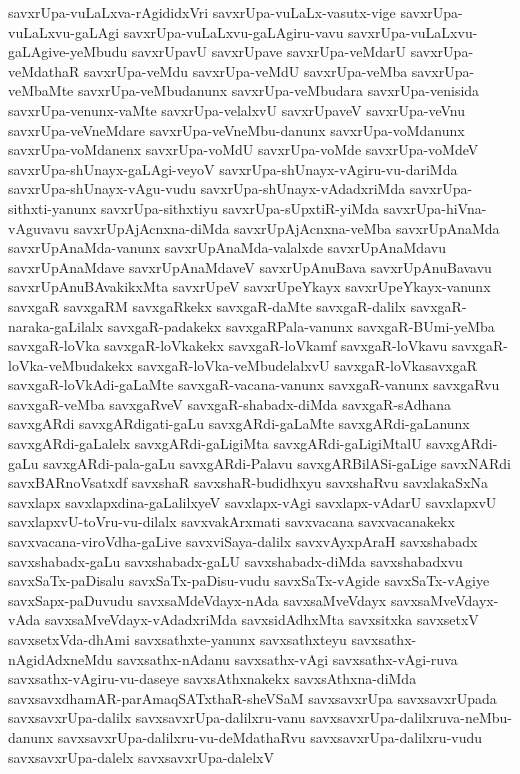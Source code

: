 {savxrUpa-vuLaLxva-rAgididxVri
savxrUpa-vuLaLx-vasutx-vige
savxrUpa-vuLaLxvu-gaLAgi
savxrUpa-vuLaLxvu-gaLAgiru-vavu
savxrUpa-vuLaLxvu-gaLAgive-yeMbudu
savxrUpavU
savxrUpave
savxrUpa-veMdarU
savxrUpa-veMdathaR
savxrUpa-veMdu
savxrUpa-veMdU
savxrUpa-veMba
savxrUpa-veMbaMte
savxrUpa-veMbudanunx
savxrUpa-veMbudara
savxrUpa-venisida
savxrUpa-venunx-vaMte
savxrUpa-velalxvU
savxrUpaveV
savxrUpa-veVnu
savxrUpa-veVneMdare
savxrUpa-veVneMbu-danunx
savxrUpa-voMdanunx
savxrUpa-voMdanenx
savxrUpa-voMdU
savxrUpa-voMde
savxrUpa-voMdeV
savxrUpa-shUnayx-gaLAgi-veyoV
savxrUpa-shUnayx-vAgiru-vu-dariMda
savxrUpa-shUnayx-vAgu-vudu
savxrUpa-shUnayx-vAdadxriMda
savxrUpa-sithxti-yanunx
savxrUpa-sithxtiyu
savxrUpa-sUpxtiR-yiMda
savxrUpa-hiVna-vAguvavu
savxrUpAjAcnxna-diMda
savxrUpAjAcnxna-veMba
savxrUpAnaMda
savxrUpAnaMda-vanunx
savxrUpAnaMda-valalxde
savxrUpAnaMdavu
savxrUpAnaMdave
savxrUpAnaMdaveV
savxrUpAnuBava
savxrUpAnuBavavu
savxrUpAnuBAvakikxMta
savxrUpeV
savxrUpeYkayx
savxrUpeYkayx-vanunx
savxgaR
savxgaRM
savxgaRkekx
savxgaR-daMte
savxgaR-dalilx
savxgaR-naraka-gaLilalx
savxgaR-padakekx
savxgaRPala-vanunx
savxgaR-BUmi-yeMba
savxgaR-loVka
savxgaR-loVkakekx
savxgaR-loVkamf
savxgaR-loVkavu
savxgaR-loVka-veMbudakekx
savxgaR-loVka-veMbudelalxvU
savxgaR-loVkasavxgaR
savxgaR-loVkAdi-gaLaMte
savxgaR-vacana-vanunx
savxgaR-vanunx
savxgaRvu
savxgaR-veMba
savxgaRveV
savxgaR-shabadx-diMda
savxgaR-sAdhana
savxgARdi
savxgARdigati-gaLu
savxgARdi-gaLaMte
savxgARdi-gaLanunx
savxgARdi-gaLalelx
savxgARdi-gaLigiMta
savxgARdi-gaLigiMtalU
savxgARdi-gaLu
savxgARdi-pala-gaLu
savxgARdi-Palavu
savxgARBilASi-gaLige
savxNARdi
savxBARnoVsatxdf
savxshaR
savxshaR-budidhxyu
savxshaRvu
savxlakaSxNa
savxlapx
savxlapxdina-gaLalilxyeV
savxlapx-vAgi
savxlapx-vAdarU
savxlapxvU
savxlapxvU-toVru-vu-dilalx
savxvakArxmati
savxvacana
savxvacanakekx
savxvacana-viroVdha-gaLive
savxviSaya-dalilx
savxvAyxpAraH
savxshabadx
savxshabadx-gaLu
savxshabadx-gaLU
savxshabadx-diMda
savxshabadxvu
savxSaTx-paDisalu
savxSaTx-paDisu-vudu
savxSaTx-vAgide
savxSaTx-vAgiye
savxSapx-paDuvudu
savxsaMdeVdayx-nAda
savxsaMveVdayx
savxsaMveVdayx-vAda
savxsaMveVdayx-vAdadxriMda
savxsidAdhxMta
savxsitxka
savxsetxV
savxsetxVda-dhAmi
savxsathxte-yanunx
savxsathxteyu
savxsathx-nAgidAdxneMdu
savxsathx-nAdanu
savxsathx-vAgi
savxsathx-vAgi-ruva
savxsathx-vAgiru-vu-daseye
savxsAthxnakekx
savxsAthxna-diMda
savxsavxdhamAR-parAmaqSATxthaR-sheVSaM
savxsavxrUpa
savxsavxrUpada
savxsavxrUpa-dalilx
savxsavxrUpa-dalilxru-vanu
savxsavxrUpa-dalilxruva-neMbu-danunx
savxsavxrUpa-dalilxru-vu-deMdathaRvu
savxsavxrUpa-dalilxru-vudu
savxsavxrUpa-dalelx
savxsavxrUpa-dalelxV
}
